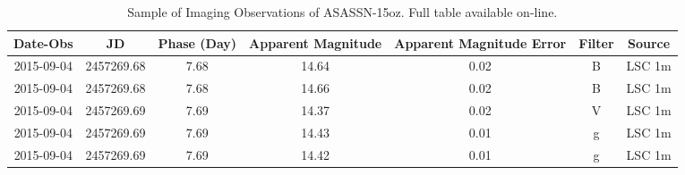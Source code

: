 \begin{table*}
\centering
\caption{Sample of Imaging Observations of ASASSN-15oz. Full table available on-line.\label{tab:LcObs}}
\begin{tabular}{ccccccc}
Date-Obs & JD & Phase (Day) & Apparent Magnitude & Apparent Magnitude Error & Filter & Source \\
\hline
2015-09-04 & 2457269.68 & 7.68 & 14.64 & 0.02 & B & LSC 1m \\
2015-09-04 & 2457269.68 & 7.68 & 14.66 & 0.02 & B & LSC 1m \\
2015-09-04 & 2457269.69 & 7.69 & 14.37 & 0.02 & V & LSC 1m \\
2015-09-04 & 2457269.69 & 7.69 & 14.43 & 0.01 & g & LSC 1m \\
2015-09-04 & 2457269.69 & 7.69 & 14.42 & 0.01 & g & LSC 1m \\
\end{tabular}
\end{table*}
